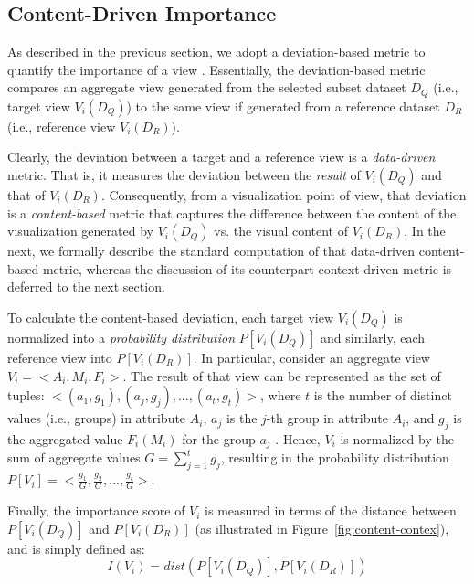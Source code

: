 \subsection{Content-Driven Importance}
\label{subsec:content_driven_deviation}

As  described in the previous section, we adopt a deviation-based metric to quantify the importance of a view \cite{Vartak2015,Vartak2014}. 
%
Essentially, the deviation-based metric compares an aggregate view generated from the selected subset dataset $D_Q$ (i.e., target view $V_i(D_Q)$) to the same view if generated from a reference dataset $D_R$ (i.e., reference view $V_i(D_R)$). 
%
%

Clearly, the deviation between a target and a reference view is a {\em data-driven} metric. 
%
That is, it measures the deviation between the {\em result} of $V_i(D_Q)$ and that of $V_i(D_R)$. 
%
Consequently, from a visualization point of view, that deviation is a {\em content-based} metric that captures the difference between the content of the visualization generated by $V_i(D_Q)$ vs. the visual content of  $V_i(D_R)$.
%
In the next, we formally describe the standard computation of that data-driven content-based metric, whereas the discussion of its counterpart context-driven metric is deferred to the next section.

To calculate the content-based deviation, each target view $V_i(D_Q)$ is normalized into a {\em probability distribution} $P[V_i(D_Q)]$ and similarly, each reference view into $P[V_i(D_R)]$.
%
In particular, consider an aggregate view $V_i=<\!A_i,M_i,F_i\!>$. 
%
The result of that view can be represented as the set of tuples: $<\!(a_1, g_1), (a_j, g_j), ..., (a_t, g_t)\!>$, where $t$ is the number of distinct values (i.e., groups) in attribute $A_i$, $a_j$ is the $j$-th group in attribute $A_i$, and $g_j$ is the aggregated value $F_i(M_i)$ for the group $a_j$ \cite{Ehsan2016, Vartak2015}. 
%
Hence, $V_i$ is normalized by the sum of aggregate values $G=\sum\limits_{j=1}^{t} g_j$, resulting in the probability distribution $P[V_i] = <\!\frac{g_1}{G}, \frac{g_2}{G}, ..., \frac{g_t}{G}\!>$.
%

Finally, the importance score of $V_i$ is measured in terms of the distance between $P[V_i(D_Q)]$ and $P[V_i(D_R)]$ (as illustrated in Figure~\ref{fig:content-contex}), and is simply defined as:
\begin{equation}
	I\left(V_i\right) = dist\left(P\left[V_i(D_Q)\right], P\left[V_i(D_R)\right]\right)
	\label{importance_score}
\end{equation}

